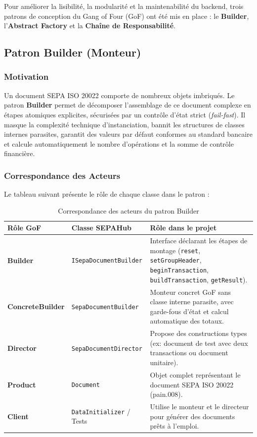 \documentclass[12pt,a4paper]{article}
\begin{document}
Pour améliorer la lisibilité, la modularité et la maintenabilité du backend, trois patrons de conception du Gang of Four (GoF) ont été mis en place : le \textbf{Builder}, l'\textbf{Abstract Factory} et la \textbf{Chaîne de Responsabilité}.

\subsection{Patron Builder (Monteur)}

\subsubsection{Motivation}
Un document SEPA ISO 20022 comporte de nombreux objets imbriqués. Le patron \textbf{Builder} permet de décomposer l'assemblage de ce document complexe en étapes atomiques explicites, sécurisées par un contrôle d'état strict (\textit{fail-fast}). Il masque la complexité technique d'instanciation, bannit les structures de classes internes parasites, garantit des valeurs par défaut conformes au standard bancaire et calcule automatiquement le nombre d'opérations et la somme de contrôle financière.

\subsubsection{Correspondance des Acteurs}
Le tableau suivant présente le rôle de chaque classe dans le patron :

\begin{table}[H]
    \centering
    \small
    \begin{tabularx}{\textwidth}{|l|p{4.2cm}|Y|}
        \hline
        \textbf{Rôle GoF} & \textbf{Classe SEPAHub} & \textbf{Rôle dans le projet} \\
        \hline
        \textbf{Builder} & \texttt{ISepaDocumentBuilder} & Interface déclarant les étapes de montage (\texttt{reset}, \allowbreak\texttt{setGroupHeader}, \allowbreak\texttt{beginTransaction}, \allowbreak\texttt{buildTransaction}, \allowbreak\texttt{getResult}). \\
        \hline
        \textbf{ConcreteBuilder} & \texttt{SepaDocumentBuilder} & Monteur concret GoF sans classe interne parasite, avec garde-fous d'état et calcul automatique des totaux. \\
        \hline
        \textbf{Director} & \texttt{SepaDocumentDirector} & Propose des constructions types (ex: document de test avec deux transactions ou document unitaire). \\
        \hline
        \textbf{Product} & \texttt{Document} & Objet complet représentant le document SEPA ISO 20022 (pain.008). \\
        \hline
        \textbf{Client} & \texttt{DataInitializer} / Tests & Utilise le monteur et le directeur pour générer des documents prêts à l'emploi. \\
        \hline
    \end{tabularx}
    \caption{Correspondance des acteurs du patron Builder}
\end{table}
\end{document}
